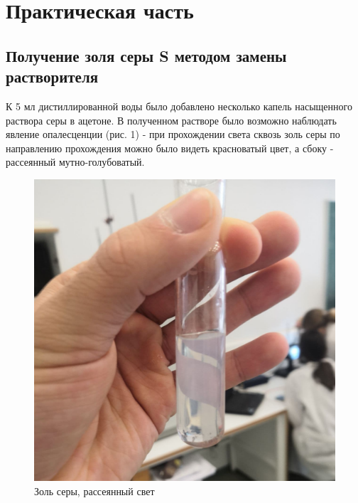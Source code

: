\documentclass[a4paper, 12pt]{article}
\begin{document}
\section{Практическая часть}
\subsection{Получение золя серы S методом замены растворителя}
К 5 мл дистиллированной воды было добавлено несколько капель насыщенного раствора серы в ацетоне. В полученном растворе было возможно наблюдать явление опалесценции (рис. 1) - при прохождении света сквозь золь серы по направлению прохождения можно было видеть красноватый цвет, а сбоку - рассеянный мутно-голубоватый.




\begin{figure}[h]
\begin{center}
\begin{minipage}[h]{0.45\linewidth}
\includegraphics[width=1\linewidth]{photo_2021-03-11_16-32-56.jpg}
\caption{Золь серы, рассеянный свет} %
\label{ris:experimoriginal} %
\end{minipage}
\hfill 
\begin{minipage}[h]{0.45\linewidth}

\end{minipage}
\end{center}
\end{figure}
\end{document}
